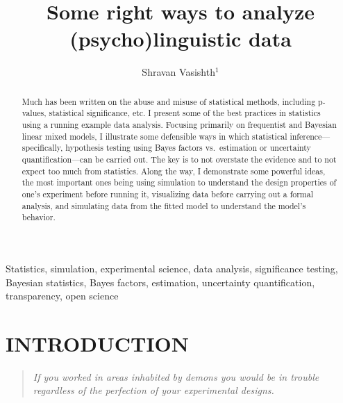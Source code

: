 \documentclass{ar-1col}\usepackage[]{graphicx}\usepackage[]{color}
\begin{document}

\title{Some right ways to analyze (psycho)linguistic data}


\author{Shravan Vasishth$^1$
}

\begin{abstract}
Much has been written on the abuse and misuse of statistical methods, including p-values, statistical significance, etc. I present some of the best practices in statistics using a running example data analysis. Focusing primarily on frequentist and Bayesian linear mixed models, I illustrate some defensible ways in which statistical inference---specifically, hypothesis testing using Bayes factors vs.\ estimation or uncertainty quantification---can be carried out. The key is to not overstate the evidence and to not expect too much from statistics. Along the way, I demonstrate some powerful ideas, the most important ones being using simulation to understand the design properties of one's experiment before running it, visualizing data before carrying out a formal analysis, and simulating data from the fitted model to understand the model's behavior. 
\end{abstract}

\begin{keywords}
Statistics, simulation, experimental science, data analysis, significance testing, Bayesian statistics, Bayes factors, estimation,  uncertainty quantification, transparency, open science
\end{keywords}
\maketitle

\tableofcontents



\section{INTRODUCTION}


\begin{quote}
\textit{If you worked in areas inhabited by demons you would be in trouble regardless of the perfection of your experimental designs.}

\citep[][p. 192]{hurlbert1984pseudoreplication}
\end{quote}
\end{document}
